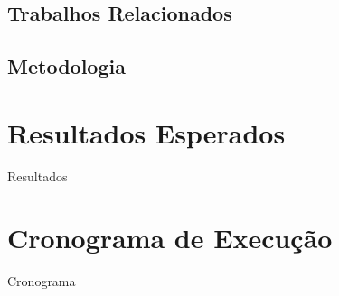 \documentclass[12pt]{article}
\begin{document}

\subsection{Trabalhos Relacionados}

\subsection{Metodologia}


\section{Resultados Esperados}

Resultados

\section{Cronograma de Execução}

Cronograma





\end{document}
